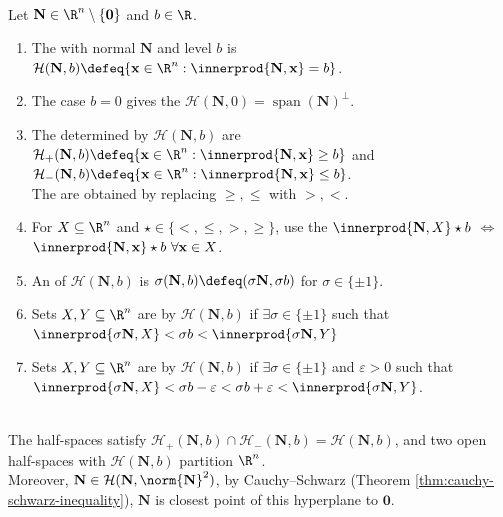 \begin{definition} \label{def:affine-hyperplanes-halfspaces-separation} \\
Let $\mathbf{N}\in\R^n\setminus\{\mathbf{0}\}$ and $b\in\R$.
\begin{enumerate}[label=(\roman*)]
\setlength{\itemsep}{0pt}
\item The  with normal $\mathbf{N}$ and level $b$ is $\mathcal{H}(\mathbf{N},b) \defeq \{\mathbf{x}\in\R^n:\innerprod{\mathbf{N},\mathbf{x}}=b\}$.
\item The case $b=0$ gives the  $\mathcal{H}(\mathbf{N},0)=\operatorname{span}(\mathbf{N})^\perp$.
\item The  determined by $\mathcal{H}(\mathbf{N},b)$ are\\
$\mathcal{H}_+(\mathbf{N},b)\defeq\{\mathbf{x}\in\R^n:\innerprod{\mathbf{N},\mathbf{x}}\geq b\}$ and $\mathcal{H}_-(\mathbf{N},b)\defeq\{\mathbf{x}\in\R^n:\innerprod{\mathbf{N},\mathbf{x}}\leq b\}$.\\
The  are obtained by replacing $\geq,\leq$ with $>,<$.
\item For $X\subseteq\R^n$ and $\star\in\{<,\leq,>,\geq\}$, use the  $\innerprod{\mathbf{N},X}\star b$ $\Longleftrightarrow$ $\innerprod{\mathbf{N},\mathbf{x}}\star b \ \forall \mathbf{x}\in X$.
\item An  of $\mathcal{H}(\mathbf{N},b)$ is $\sigma(\mathbf{N},b)\defeq(\sigma\mathbf{N},\sigma b)$ for $\sigma\in\{\pm1\}$.
\item Sets $X,Y\subseteq\R^n$ are  by $\mathcal{H}(\mathbf{N},b)$ if $\exists\sigma\in\{\pm1\}$ such that $\innerprod{\sigma\mathbf{N},X}<\sigma b<\innerprod{\sigma\mathbf{N},Y}$
\item Sets $X,Y\subseteq\R^n$ are  by $\mathcal{H}(\mathbf{N},b)$ if $\exists\sigma\in\{\pm1\}$ and $\varepsilon>0$ such that\\
$\innerprod{\sigma\mathbf{N},X}<\sigma b-\varepsilon<\sigma b+\varepsilon<\innerprod{\sigma\mathbf{N},Y}$.
\end{enumerate}
\end{definition}

\begin{remark} \label{rem:hyperplane-basic-geometry} \\
The half-spaces satisfy $\mathcal{H}_+(\mathbf{N},b)\cap\mathcal{H}_-(\mathbf{N},b)=\mathcal{H}(\mathbf{N},b)$, and two open half-spaces with $\mathcal{H}(\mathbf{N},b)$ partition $\R^n$.\\
Moreover, $\mathbf{N}\in\mathcal{H}(\mathbf{N},\norm{\mathbf{N}}^2)$, by Cauchy--Schwarz (Theorem \ref{thm:cauchy-schwarz-inequality}), $\mathbf{N}$ is closest point of this hyperplane to $\mathbf{0}$.
\end{remark}

